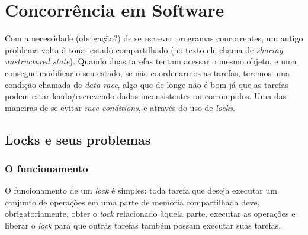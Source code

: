 \documentclass[]{article}
\begin{document}
\section{Concorrência em Software}		
	\par Com a necessidade (obrigação?) de se escrever programas concorrentes, um antigo problema volta à tona: estado
	compartilhado (no texto ele chama de \textit{sharing unstructured state}). Quando duas tarefas tentam acessar o mesmo
	objeto, e uma consegue modificar o seu estado, se não coordenarmos as tarefas, teremos uma condição  chamada de
	\textit{data race}, algo que de longe não é bom já que as tarefas podem estar lendo/escrevendo dados inconsistentes
	ou corrompidos. Uma das maneiras de se evitar \textit{race conditions}, é através do uso de \textit{locks}.
	
	
	\subsection{Locks e seus problemas}

	\subsubsection{O funcionamento}
		\par O funcionamento de um \textit{lock} é simples: toda tarefa que deseja executar um conjunto de operações em
		uma parte de memória compartilhada deve, obrigatoriamente, obter o \textit{lock} relacionado àquela parte, 
		executar as operações e liberar o \textit{lock} para que outras tarefas também possam executar suas tarefas.
	
\end{document}
